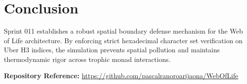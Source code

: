 \documentclass[11pt, a4paper]{article}
\begin{document}
\section{Conclusion}
Sprint 011 establishes a robust spatial boundary defense mechanism for the Web of Life architecture. By enforcing strict hexadecimal character set verification on Uber H3 indices, the simulation prevents spatial pollution and maintains thermodynamic rigor across trophic monad interactions.

\vspace{1em}
\noindent\textbf{Repository Reference:} \url{https://github.com/pascalranoroarijaona/WebOfLife}
\end{document}
